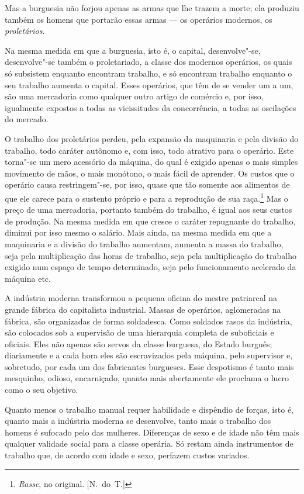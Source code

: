 Mas a burguesia não forjou apenas as armas que lhe trazem a morte; ela
produziu também os homens que portarão essas armas  ---  os operários
modernos, os \textit{proletários}.

Na mesma medida em que a burguesia, isto é, o capital, desenvolve"-se,
desenvolve"-se também o proletariado, a classe dos modernos operários,
os quais só subsistem enquanto encontram trabalho, e só encontram
trabalho enquanto o seu trabalho aumenta o capital. Esses operários,
que têm de se vender um a um, são uma mercadoria como qualquer outro
artigo de comércio e, por isso, igualmente expostos a todas as
vicissitudes da concorrência, a todas as oscilações do mercado.

O trabalho dos proletários perdeu, pela expansão da maquinaria e
pela divisão do trabalho, todo caráter autônomo e, com isso, todo
atrativo para o operário. Este torna"-se um mero acessório da máquina,
do qual é exigido apenas o mais simples movimento de mãos, o mais
monótono, o mais fácil de aprender. Os custos que o operário causa
restringem"-se, por isso, quase que tão somente aos alimentos de que
ele carece para o sustento próprio e para a reprodução de sua
raça.\footnote{ \textit{Rasse}, no original. [N.~do~T.]}
Mas o preço de uma mercadoria, portanto também do trabalho, é
igual aos seus custos de produção. Na mesma medida em que cresce o
caráter repugnante do trabalho, diminui por isso mesmo o salário. Mais
ainda, na mesma medida em que a maquinaria e a divisão do trabalho
aumentam, aumenta a massa do trabalho, seja pela multiplicação das
horas de trabalho, seja pela multiplicação do trabalho exigido num
espaço de tempo determinado, seja pelo funcionamento acelerado da
máquina etc.


A indústria moderna transformou a pequena oficina do mestre patriarcal
na grande fábrica do capitalista industrial. Massas de operários,
aglomeradas na fábrica, são organizadas de forma soldadesca. Como
soldados rasos da indústria, são colocados sob a supervisão de uma
hierarquia completa de suboficiais e oficiais. Eles não apenas são
servos da classe burguesa, do Estado burguês; diariamente e a cada hora
eles são escravizados pela máquina, pelo supervisor e, sobretudo, por
cada um dos fabricantes burgueses. Esse despotismo é tanto mais
mesquinho, odioso, encarniçado, quanto mais abertamente ele proclama o
lucro como o seu objetivo.


Quanto menos o trabalho manual requer habilidade e dispêndio de forças,
isto é, quanto mais a indústria moderna se desenvolve, tanto mais o
trabalho dos homens é sufocado pelo das mulheres. Diferenças de sexo e
de idade não têm mais qualquer validade social para a classe operária.
Só restam ainda instrumentos de trabalho que, de acordo com idade e
sexo, perfazem custos variados.

